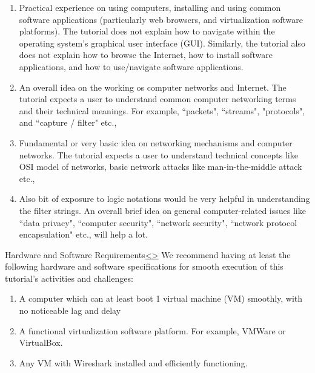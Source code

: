 \documentclass[12pt]{extarticle}
\newenvironment{instructionblock}{\Large\bgroup}{\egroup}
\newcommand{\ben}{\begin{enumerate}}
\newcommand{\een}{\end{enumerate}}
\begin{document}
\ben


\item Practical experience on using computers, installing and using common software applications (particularly web browsers, and virtualization software platforms). The tutorial does not explain how to navigate within the operating system's graphical user interface (GUI). Similarly, the tutorial also does not explain how to browse the Internet, how to install software applications, and how to use/navigate software applications. 

\item An overall idea on the working os computer networks and Internet. The tutorial expects a user to understand common computer networking terms and their technical meanings. For example, ``packets", ``streams", "protocols", and ``capture / filter" etc., 

\item Fundamental or very basic idea on networking mechanisms and computer networks. The tutorial expects a user to understand technical concepts like OSI model of networks, basic network attacks like man-in-the-middle attack etc.,

\item Also bit of exposure to logic notations would be very helpful in understanding the filter strings. An overall brief idea on general computer-related issues like ``data privacy", ``computer security", ``network security", ``network protocol encapsulation" etc., will help a lot.


\een 







\pagebreak
\begin{slide}{Hardware and Software Requirements}{\hyperref[slide 2]{\textless}\hyperref[slide 4]{\textgreater}}
	\begin{instructionblock}
		We recommend having at least the following hardware and software specifications for smooth execution of this tutorial's activities and challenges:
		\begin{enumerate}
			\item {A computer which can at least boot 1 virtual machine (VM) smoothly, with no noticeable lag and delay}
			\item {A functional virtualization software platform. For example, VMWare or VirtualBox.}
			\item {Any VM with Wireshark installed and efficiently functioning.  }
		\end{enumerate}
	\end{instructionblock}
\end{slide}
\end{document}
